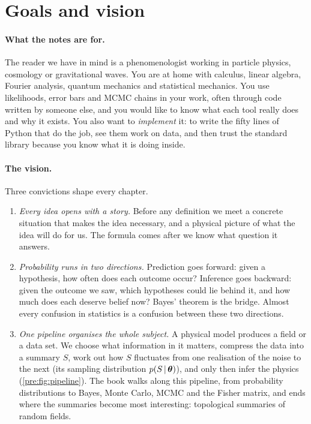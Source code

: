 \section*{Goals and vision}
\paragraph{What the notes are for.}
The reader we have in mind is a phenomenologist working in particle physics,
cosmology or gravitational waves. You are at home with calculus, linear
algebra, Fourier analysis, quantum mechanics and statistical mechanics. You
use likelihoods, error bars and MCMC chains in your work, often through code
written by someone else, and you would like to know what each tool really
does and why it exists. You also want to \emph{implement} it: to write the
fifty lines of Python that do the job, see them work on data, and then trust
the standard library because you know what it is doing inside.

\paragraph{The vision.}
Three convictions shape every chapter.
\begin{enumerate}
  \item \emph{Every idea opens with a story.} Before any definition we meet a
        concrete situation that makes the idea necessary, and a physical
        picture of what the idea will do for us. The formula comes after we
        know what question it answers.
  \item \emph{Probability runs in two directions.} Prediction goes forward:
        given a hypothesis, how often does each outcome occur? Inference goes
        backward: given the outcome we saw, which hypotheses could lie behind
        it, and how much does each deserve belief now? Bayes' theorem is the bridge.
        Almost every confusion in statistics is a confusion between these two
        directions.
  \item \emph{One pipeline organises the whole subject.} A physical model
        produces a field or a data set. We choose what information in it
        matters, compress the data into a summary $S$, work out how $S$
        fluctuates from one realisation of the noise to the next (its sampling
        distribution $p(S\,\vert\,\bm{\theta})$), and only then infer the physics
        (\cref{pre:fig:pipeline}). The book walks along this pipeline, from
        probability distributions to Bayes, Monte Carlo, MCMC and the Fisher
        matrix, and ends where the summaries become most interesting:
        topological summaries of random fields.
\end{enumerate}

